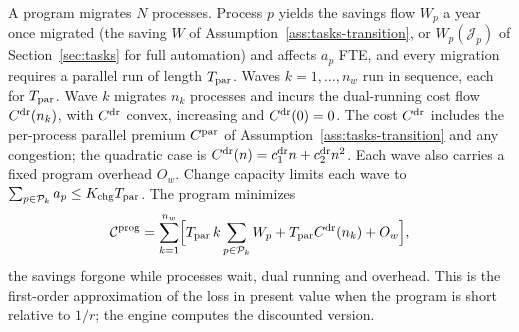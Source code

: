 \begin{assumption}[Program]\label{ass:ext-program}
A program migrates $N$ processes. Process $p$ yields the savings flow $W_p$ a year once migrated (the saving $W$ of Assumption~\ref{ass:tasks-transition}, or $W_p(\mathcal J_p)$ of Section~\ref{sec:tasks} for full automation) and affects $a_p$ FTE, and every migration requires a parallel run of length $T_{\rm par}$. Waves $k=1,\dots,n_w$ run in sequence, each for $T_{\rm par}$. Wave $k$ migrates $n_k$ processes and incurs the dual-running cost flow $C^{\rm dr}(n_k)$, with $C^{\rm dr}$ convex, increasing and $C^{\rm dr}(0)=0$. The cost $C^{\rm dr}$ includes the per-process parallel premium $C^{\rm par}$ of Assumption~\ref{ass:tasks-transition} and any congestion; the quadratic case is $C^{\rm dr}(n)=c^{\rm dr}_1n+c^{\rm dr}_2n^2$. Each wave also carries a fixed program overhead $O_w$. Change capacity limits each wave to $\sum_{p\in\mathcal P_k}a_p\le K_{\rm chg}T_{\rm par}$. The program minimizes
\begin{equation}\label{eq:ext-progcost}
\mathcal C^{\rm prog}=\sum_{k=1}^{n_w}\Bigl[T_{\rm par}\,k\sum_{p\in\mathcal P_k}W_p+T_{\rm par}C^{\rm dr}(n_k)+O_w\Bigr],
\end{equation}
the savings forgone while processes wait, dual running and overhead. This is the first-order approximation of the loss in present value when the program is short relative to $1/r$; the engine computes the discounted version.
\end{assumption}

